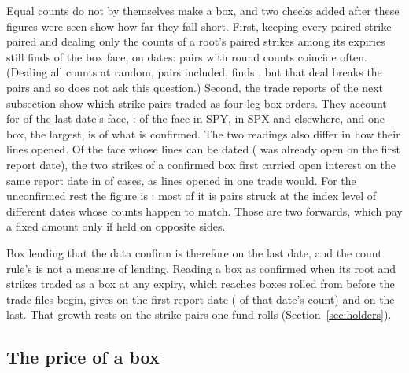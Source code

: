 \documentclass[11pt]{article}
\begin{document}
Equal counts do not by themselves make a box, and two checks added after these figures
were seen show how far they fall short. First, keeping every paired strike paired and
dealing only the counts of a root's paired strikes among its expiries still finds
\AnatChanceBoxPairsKept{} of the box face, on \AnatChanceDates{} dates: pairs with round
counts coincide often. (Dealing all counts at random, pairs included, finds
\AnatChanceBox{}, but that deal breaks the pairs and so does not ask this question.)
Second, the trade reports of the next subsection show which strike pairs traded as
four-leg box orders. They account for \BoxRTradedShare{} of the last date's face,
\BoxRTradedFace{}: \BoxRTradedSPY{} of the face in SPY, \BoxRTradedSPX{} in SPX and
\BoxRTradedElse{} elsewhere, and one box, the largest, is \BoxRLargestOfTraded{} of what is
confirmed. The two readings also differ in how their lines opened. Of the face whose
lines can be dated (\BoxRCensored{} was already open on the first report date), the two
strikes of a confirmed box first carried open interest on the same report date in
\BoxRSameDateConfirmed{} of cases, as lines opened in one trade would. For the
unconfirmed rest the figure is \BoxRSameDateUnconfirmed{}: most of it is pairs struck at
the index level of different dates whose counts happen to match. Those are two forwards,
which pay a fixed amount only if held on opposite sides.

Box lending that the data confirm is therefore \BoxRTradedFace{} on the last date, and
the count rule's \AnatBoxFace{} is not a measure of lending. Reading a box as confirmed
when its root and strikes traded as a box at any expiry, which reaches boxes rolled from
before the trade files begin, gives \BoxRConfirmedFirst{} on the first report date
(\BoxRConfirmedFirstShare{} of that date's count) and \BoxRConfirmedLast{} on the last.
That growth rests on the strike pairs one fund rolls (Section~\ref{sec:holders}).

\subsection{The price of a box}
\label{sec:box-rates}
\end{document}
